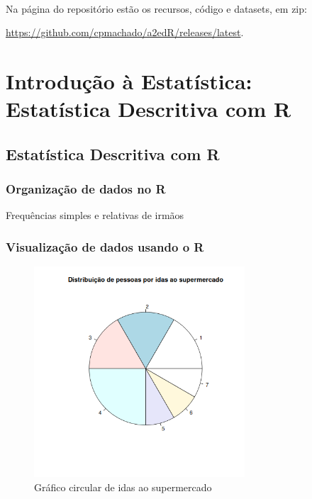 \documentclass[11pt,a4paper]{report}
\begin{document}
\paragraph{} Na página do repositório\cite{a2edRRepo}
estão os recursos, código e datasets, em zip:

\begin{center}
	\url{https://github.com/cpmachado/a2edR/releases/latest}.
\end{center}


\part{Introdução à Estatística: Estatística Descritiva com R}

\setcounter{chapter}{2}
\chapter{Estatística Descritiva com R}
\section{Organização de dados no R}



\begin{table}[h!]
	\centering
	\caption{Frequências simples e relativas de irmãos}
	\label{tab:3.1}
\end{table}

\clearpage

\section{Visualização de dados usando o R}

\begin{figure}[h!]
	\centering
	\includegraphics[width=0.7\textwidth]{imagem/ieedr/ex3_2.png}
	\caption{Gráfico circular de idas ao supermercado}
\end{figure}

\end{document}
